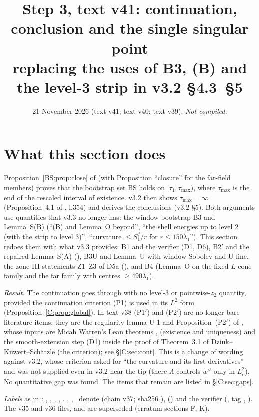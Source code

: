 \documentclass[11pt]{article}
\title{Step 3, text v41: continuation, conclusion and the single singular point\\[2pt]\large replacing the uses of B3, (B) and the level-3 strip in v3.2 \S4.3--\S5}
\author{}\date{21 November 2026 (text v41; text v40; text v39). \emph{Not compiled.}}
\begin{document}
\maketitle
\fi

\section{What this section does}\label{C:sec:intro}
Proposition~\ref{BS:prop:close} of  (with  Proposition ``closure'' for the far-field members) proves that the bootstrap set $\mathrm{BS}$ holds on $[\tau_1,\tau_{\max})$, where $\tau_{\max}$ is the end of the rescaled interval of existence. v3.2 then shows $\tau_{\max}=\infty$ (Proposition~4.1 of , l.354) and derives the conclusions (v3.2 \S5). Both arguments use quantities that v3.3 no longer has: the window bootstrap B3 and Lemma~S(B) (``(B) and Lemma~O beyond'', ``the shell energies up to level 2 (with the strip to level 3)'', ``curvature $\le S_1^f/r$ for $r\le150\lambda_1$''). This section redoes them with what v3.3 provides: B1 and the verifier (D1, D6), B2$'$ and the repaired Lemma~S(A) (), B3U and Lemma~U with window Sobolev and U-fine, the zone-III statements Z1--Z3 of D5a (), and B4 (Lemma~O on the fixed-$L$ cone family and the far family with centres $\ge490\lambda_1$).

\noindent\emph{Result.} The continuation goes through with no level-3 or pointwise-$z_2$ quantity, provided the continuation criterion (P1) is used in its $L^2$ form (Proposition~\ref{C:prop:global}). In text v38 (P1$'$) and (P2$'$) are no longer bare literature items: they are the regularity lemma U-1 and Proposition~(P2$'$) of  \tH, whose inputs are Micah Warren's Lean theorems ,  \cite{CWFlow} (existence and uniqueness) and the smooth-extension step (D1) inside the proof of Theorem~3.1 of Dziuk--Kuwert--Sch\"atzle \cite{DKS2002} (the criterion); see \S\ref{C:sec:cont}. This is a change of wording against v3.2, whose criterion asked for ``the curvature and its first derivatives'' and was not supplied even in v3.2 near the tip (there $\Lambda$ controls $\tilde w''$ only in $L^2_\rho$). No quantitative gap was found. The items that remain are listed in \S\ref{C:sec:gaps}.

\noindent\emph{Labels} as in : \tC, \tP, \tH, \tE, \tB. \SU, \SZ, \SV\ denote  (chain v37; sha256 ),  () and the verifier  (, tag , ). The v35 and v36 files,  and  are superseded (erratum sections F, K).
\end{document}

